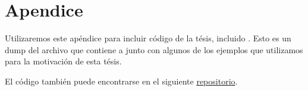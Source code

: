 \chapter{Apendice}\label{ch:apendice}

Utilizaremos este apéndice para incluir código de la tésis, incluido \lift.
Esto es un dump del archivo que contiene a \lift junto con algunos de los ejemplos que utilizamos para la motivación de esta tésis.

El código también puede encontrarse en el siguiente \href{https://github.com/ignatirabo/lift}{repositorio}.

